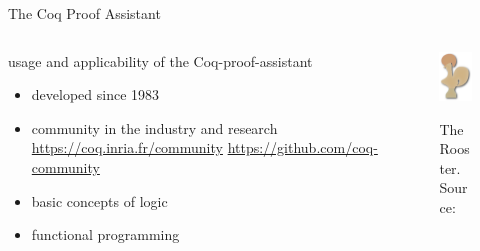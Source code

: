 \documentclass{beamer}
\begin{document}
	\begin{frame}{The Coq Proof Assistant}
	
		\begin{columns}[t]
			\begin{column}{8cm}
			usage and applicability of the Coq-proof-assistant
	
			\begin{itemize}
			\item developed since 1983
			\item community in the industry and research
			       \url{https://coq.inria.fr/community}
				   \url{https://github.com/coq-community}
		
			\end{itemize}
			
		    \begin{itemize}
			\item basic concepts of logic
			\item functional programming
			\end{itemize}
		\end{column}
		\begin{column}{2.5cm}
			\begin{figure}[h]
			\includegraphics[width=.9\textwidth]{barron_logo.png} 
			\label{coq_rorster}
			\caption[c]{The Rooster. Source:\cite{COQ}}
			\end{figure}
		\end{column}
		\end{columns}
		
	\end{frame}
	
\end{document}
